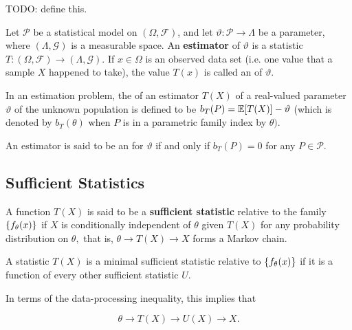 \documentclass{article}
\begin{document}
\begin{definition}
TODO: define this.
\end{definition}

\begin{definition}[Estimator]
        Let $\mathcal{P}$ be a \@{statistical model} on $(\Omega, \mathcal{F})$, and let
        $\vartheta : \mathcal{P} \to \Lambda$ be a \@{parameter}, where $(\Lambda, \mathcal{G})$ is a
        \@{measurable space}. An \textbf{estimator} of $\vartheta$ is a \@{statistic}
        $T : (\Omega, \mathcal{F}) \to (\Lambda, \mathcal{G})$. If $x \in \Omega$ is an observed
	\@{data set} (i.e. one value that a \@{sample} $X$ happened to take), the value $T(x)$ is
	called an  of $\vartheta$.
\end{definition}

\begin{definition}[Bias]
	In an estimation problem, the  of an \@{estimator} $T(X)$ of a real-valued \@{parameter} $\vartheta$ of the unknown \@{population} is defined to be $b_T(P) = \mathbb{E}[T(X)] - \vartheta$ (which is denoted by $b_T(\theta)$ when $P$ is in a \@{parametric family} index by $\theta).$

	An estimator is said to be an  for $\vartheta$ if and only if $b_T(P) = 0$ for any $P \in \mathcal{P}.$
\end{definition}

\subsection{Sufficient Statistics}

\begin{definition}
	A \@{function} $T(X)$ is said to be a \textbf{sufficient statistic} relative to the family $\left\{ f_\theta(x) \right\}$ if $X$ is \@{conditionally independent} of $\theta$ given $T(X)$ for any \@{probability distribution} on $\theta,$ that is, $\theta \to T(X) \to X$ forms a \@{Markov chain}.
\end{definition}

\begin{definition}
	A \@{statistic} $T(X)$ is a \@{minimal sufficient statistic} relative to $\left\{ f_\theta(x) \right\}$ if it is a \@{function} of every other \@{sufficient statistic} $U.$ 
\end{definition}
\begin{note}
	In terms of the \@{data-processing inequality}, this implies that

	\[ \theta \to T(X) \to U(X) \to X. \]
\end{note}
\end{document}
